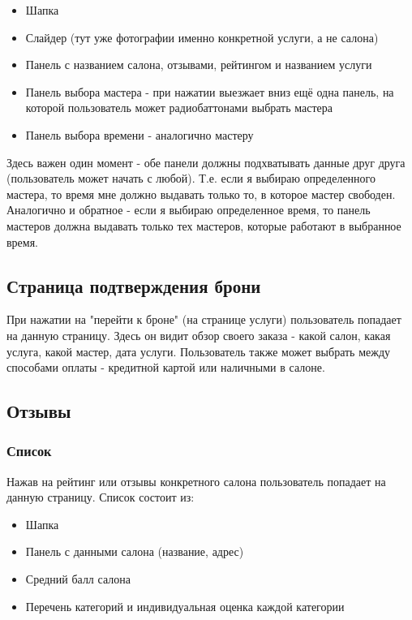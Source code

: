 \documentclass[DIV=calc, paper=a4, fontsize=11pt]{scrartcl} %
\begin{document}
\begin{itemize}
	\item Шапка
	\item Слайдер (тут уже фотографии именно конкретной услуги, а не салона)
	\item Панель с названием салона, отзывами, рейтингом и названием услуги
	\item Панель выбора мастера - при нажатии выезжает вниз ещё одна панель, на которой пользователь может радиобаттонами выбрать мастера
	\item Панель выбора времени - аналогично мастеру
\end{itemize}

Здесь важен один момент - обе панели должны подхватывать данные друг друга (пользователь может начать с любой). Т.е. если я выбираю определенного мастера, то время мне должно выдавать только то, в которое мастер свободен.
\\[0.5cm]
Аналогично и обратное - если я выбираю определенное время, то панель мастеров должна выдавать только тех мастеров, которые работают в выбранное время.

\subsection{Страница подтверждения брони}
При нажатии на "перейти к броне" (на странице услуги) пользователь попадает на данную страницу. Здесь он видит обзор своего заказа - какой салон, какая услуга, какой мастер, дата услуги. Пользователь также может выбрать между способами оплаты - кредитной картой или наличными в салоне.

\subsection{Отзывы}

\subsubsection{Список}

Нажав на рейтинг или отзывы конкретного салона пользователь попадает на данную страницу. Список состоит из:

\begin{itemize}
	\item Шапка
	\item Панель с данными салона (название, адрес)
	\item Средний балл салона
	\item Перечень категорий и индивидуальная оценка каждой категории
\end{itemize}
\end{document}

